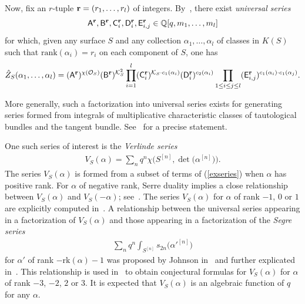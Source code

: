 \documentclass[10pt,a4paper]{amsart}
\numberwithin{equation}{section}
\def\Q{\mathbb Q}
\begin{document}
Now, fix an $r$-tuple ${\bf r}=(r_1,\dots,r_l)$ of integers. By~\cite[Theorem~4.2]{EGL}, there exist {\em universal series}
\begin{gather}\label{univseries}
\mathsf{A}^{\bf{r}}, \mathsf{B}^{\bf{r}}, \mathsf{C}^{\bf{r}}_{i}, \mathsf{D}^{\bf{r}}_{i}, \mathsf{E}^{\bf{r}}_{i,j} \in \Q[q,m_1,\dots,m_l]
\end{gather}
for which, given any surface $S$ and any collection $\alpha_1,\dots,\alpha_l$ of classes in $K(S)$ such that $\mathrm{rank}(\alpha_i)=r_i$ on each component of $S$, one has
\begin{align}\label{univeq}
\hat{Z}_S( \alpha_1,\dots,\alpha_l)=(\mathsf{A}^{\bf{r}})^{\chi(\mathcal{O}_S)} (\mathsf{B}^{\bf{r}})^{\mathcal{K}_S^2}\prod_{i=1}^{l} (\mathsf{C}^{\bf{r}}_i)^{\mathcal{K}_S\cdot c_1(\alpha_i)}(\mathsf{D}^{\bf{r}}_{i})^{c_2(\alpha_i)} \prod_{1\leq i\leq j\leq l} (\mathsf{E}^{\bf{r}}_{i,j} )^{c_1(\alpha_i)\cdot c_1(\alpha_j)}.
\end{align}

More generally, such a factorization into universal series exists for generating series formed from integrals of multiplicative characteristic classes of tautological bundles and the tangent bundle. See~\cite[Theorem~4.2]{EGL} for a precise statement.

One such series of interest is the {\em Verlinde series}
\begin{gather*}%
V_S(\alpha)= \sum_{n}q^{n}\chi\big(S^{[n]},\det\big(\alpha^{[n]}\big)\big).
\end{gather*}
The series $V_S(\alpha)$ is formed from a subset of terms of (\ref{exseries}) when $\alpha$ has positive rank. For $\alpha$ of negative rank, Serre duality implies a close relationship between $V_S(\alpha)$ and $V_S(-\alpha)$; see~\cite[Theorem~5.3]{EGL}. The series $V_S(\alpha)$ for $\alpha$ of rank $-1$, $0$ or $1$ are explicitly computed in~\cite[Theorem~5.3]{EGL}. A relationship between the universal series appearing in a factorization of $V_S(\alpha)$ and those appearing in a factorization of the {\em Segre series}
\begin{gather*}
\sum_n q^n\int_{S^{[n]}} s_{2n}\big(\alpha'^{[n]}\big)
\end{gather*}
for $\alpha'$ of rank $-\mathrm{rk}(\alpha)-1$ was proposed by Johnson in~\cite{J} and further explicated in~\cite[Conjecture 1]{MOP2}. This relationship is used in~\cite{MOP2, MOP3} to obtain conjectural formulas for $V_S(\alpha)$ for $\alpha$ of rank $-3$, $-2$, $2$ or $3$. It is expected that $V_S(\alpha)$ is an algebraic function of $q$ for any $\alpha$.
\end{document}
